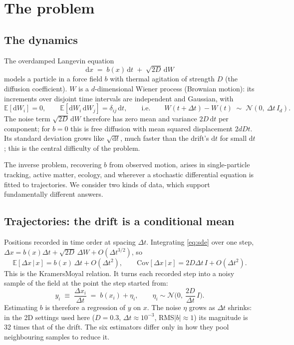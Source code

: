\documentclass[11pt,a4paper]{article}
\newcommand{\dt}{\Delta t}
\newcommand{\dx}{\Delta x}
\newcommand{\E}{\mathbb{E}}
\begin{document}
\section{The problem}

\subsection{The dynamics}

The overdamped Langevin equation
\begin{equation}
  \mathrm dx \;=\; b(x)\,\mathrm dt \;+\; \sqrt{2D}\,\mathrm dW
  \label{eq:sde}
\end{equation}
models a particle in a force field $b$ with thermal agitation of strength $D$ (the
diffusion coefficient). $W$ is a $d$-dimensional Wiener process (Brownian motion): its
increments over disjoint time intervals are independent and Gaussian, with
\begin{equation}
  \E[\mathrm dW_i] = 0,
  \qquad
  \E[\mathrm dW_i\,\mathrm dW_j] = \delta_{ij}\,\mathrm dt ,
  \qquad\text{i.e.}\qquad
  W(t+\dt)-W(t)\;\sim\;\mathcal N(0,\ \dt\, I_d).
\end{equation}
The noise term $\sqrt{2D}\,\mathrm dW$ therefore has zero mean and variance $2D\,\mathrm dt$
per component; for $b=0$ this is free diffusion with mean squared displacement $2dDt$.
Its standard deviation grows like $\sqrt{\mathrm dt}$, much faster than the drift's
$\mathrm dt$ for small $\mathrm dt$; this is the central difficulty of the problem.

The inverse problem, recovering $b$ from observed motion, arises in single-particle
tracking, active matter, ecology, and wherever a stochastic differential equation is fitted
to trajectories. We consider two kinds of data, which support fundamentally different answers.

\subsection{Trajectories: the drift is a conditional mean}

Positions recorded in time order at spacing $\dt$. Integrating \eqref{eq:sde} over one step,
$\dx = b(x)\dt + \sqrt{2D}\,\Delta W + O(\dt^{3/2})$, so
\begin{equation}
  \E[\dx \,|\, x] = b(x)\,\dt + O(\dt^2),
  \qquad
  \mathrm{Cov}[\dx \,|\, x] = 2D\dt\, I + O(\dt^2).
\end{equation}
This is the Kramers\textendash Moyal relation. It turns each recorded step into a noisy
sample of the field at the point the step started from:
\begin{equation}
  y_i \;\equiv\; \frac{\dx_i}{\dt} \;=\; b(x_i) + \eta_i ,
  \qquad
  \eta_i \sim \mathcal N\!\Big(0,\ \frac{2D}{\dt}\, I\Big).
  \label{eq:km}
\end{equation}
Estimating $b$ is therefore a regression of $y$ on $x$. The noise $\eta$ grows as $\dt$
shrinks: in the 2D settings used here ($D=0.3$, $\dt\approx10^{-3}$, RMS$|b|\approx1$) its
magnitude is 32 times that of the drift. The six estimators differ only in how they pool
neighbouring samples to reduce it.
\end{document}
